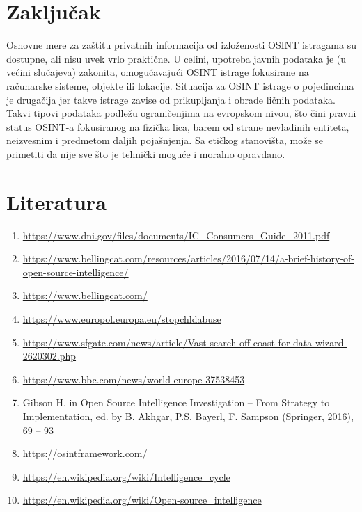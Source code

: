 \documentclass[fleqn, 12pt]{article}
\begin{document}
\section{Zaključak}
Osnovne mere za zaštitu privatnih informacija od izloženosti OSINT istragama su dostupne, ali nisu uvek vrlo praktične. U celini, upotreba javnih podataka je (u većini slučajeva) zakonita, omogućavajući OSINT istrage fokusirane na računarske sisteme, objekte ili lokacije. Situacija za OSINT istrage o pojedincima je drugačija jer takve istrage zavise od prikupljanja i obrade ličnih podataka. Takvi tipovi podataka podležu ograničenjima na evropskom nivou, što čini pravni status OSINT-a fokusiranog na fizička lica, barem od strane nevladinih entiteta, neizvesnim i predmetom daljih pojašnjenja. Sa etičkog stanovišta, može se primetiti da nije sve što je tehnički moguće i moralno opravdano.
\newpage
\section{Literatura}
\begin{enumerate}[label=(\arabic*)]
\item \url{https://www.dni.gov/files/documents/IC_Consumers_Guide_2011.pdf}
\item \url{https://www.bellingcat.com/resources/articles/2016/07/14/a-brief-history-of-open-source-intelligence/ }
\item \url{https://www.bellingcat.com/}
\item \url{https://www.europol.europa.eu/stopchldabuse}
\item \url{https://www.sfgate.com/news/article/Vast-search-off-coast-for-data-wizard-2620302.php}
\item
\url{https://www.bbc.com/news/world-europe-37538453}
\item Gibson H, in Open Source Intelligence Investigation – From Strategy to Implementation, ed. by B. Akhgar,
P.S. Bayerl, F. Sampson (Springer, 2016), 69 – 93
\item \url{https://osintframework.com/}
\item
\url{https://en.wikipedia.org/wiki/Intelligence_cycle}
\item
\url{https://en.wikipedia.org/wiki/Open-source_intelligence}
\end{enumerate}
\end{document}
